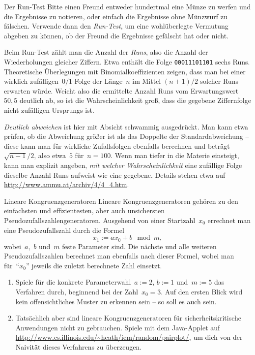 \documentclass{../zirkelblatt}
\begin{document}
\begin{aufgabeShaded}{Der Run-Test}
Bitte einen Freund entweder hundertmal eine Münze zu werfen und die
Ergebnisse zu notieren, oder einfach die Ergebnisse ohne Münzwurf zu fälschen.
Verwende dann den \emph{Run-Test}, um eine wohlüberlegte Vermutung abgeben zu können,
ob der Freund die Ergebnisse gefälscht hat oder nicht.

Beim Run-Test zählt man die Anzahl der \emph{Runs}, also die Anzahl der Wiederholungen
gleicher Ziffern. Etwa enthält die Folge \texttt{00011101101} sechs Runs.
Theoretische Überlegungen mit Binomialkoeffizienten zeigen, dass man bei einer
wirklich zufälligen~$0/1$-Folge der Länge~$n$ im Mittel $(n+1)/2$ solcher Runs
erwarten würde. Weicht also die ermittelte Anzahl Runs vom
Erwartungswert~$50{,}5$ deutlich ab, so ist die Wahrscheinlichkeit groß, dass
die gegebene Ziffernfolge nicht zufälligen Ursprungs ist.

\emph{Deutlich abweichen} ist hier mit Absicht schwammig ausgedrückt. Man kann
etwa prüfen, ob die Abweichung größer ist als das Doppelte der Standardabweichung
-- diese kann man für wirkliche Zufallsfolgen ebenfalls berechnen und
beträgt~$\sqrt{n-1}/2$, also etwa~$5$ für~$n = 100$. Wenn man tiefer in die Materie einsteigt, kann man explizit
angeben, \emph{mit welcher Wahrscheinlichkeit} eine zufällige Folge dieselbe
Anzahl Runs aufweist wie eine gegebene. Details stehen etwa auf
\url{http://www.ammu.at/archiv/4/4_4.htm}.
\end{aufgabeShaded}

\begin{aufgabeShaded}{Lineare Kongruenzgeneratoren}
Lineare Kongruenzgeneratoren gehören zu den einfachsten und effizientesten,
aber auch unsichersten Pseudozufallszahlengeneratoren. Ausgehend von einer
Startzahl~$x_0$ errechnet man eine Pseudozufallszahl durch die Formel
\[ x_1 := ax_0 + b \mod m, \]
wobei~$a$,~$b$ und~$m$ feste Parameter sind. Die nächste und alle weiteren
Pseudozufallszahlen berechnet man ebenfalls nach dieser Formel, wobei man
für~"`$x_0$"' jeweils die zuletzt berechnete Zahl einsetzt.
\begin{enumerate}
\item Spiele für die konkrete Parameterwahl~$a := 2$, $b := 1$ und~$m := 5$ das
Verfahren durch, beginnend bei der Zahl~$x_0 = 3$. Auf den ersten Blick wird kein
offensichtliches Muster zu erkennen sein -- so soll es auch sein.
\item Tatsächlich aber sind lineare Kongruenzgeneratoren für
sicherheitskritische Anwendungen nicht zu gebrauchen. Spiele mit dem Java-Applet auf
\url{http://www.cs.illinois.edu/~heath/iem/random/pairplot/}, um dich von der
Naivität dieses Verfahrens zu überzeugen.
\end{enumerate}
\end{aufgabeShaded}
\end{document}
